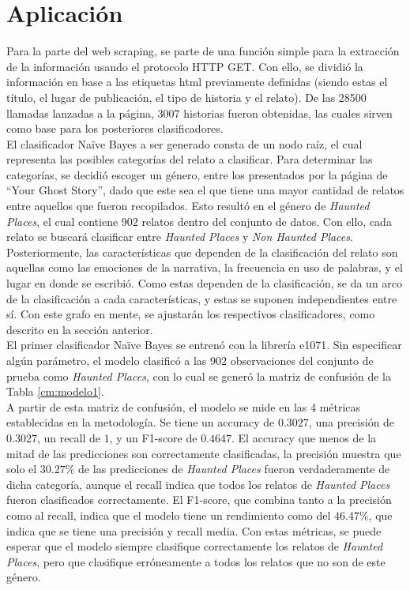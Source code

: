 \documentclass[12pt, letterpaper]{report}
\begin{document}
\section*{Aplicación}

Para la parte del web scraping, se parte de una función simple para la extracción de la información usando el protocolo HTTP GET. Con ello, se dividió la información en base a las etiquetas html previamente definidas (siendo estas el título, el lugar de publicación, el tipo de historia y el relato). De las 28500 llamadas lanzadas a la página, 3007 historias fueron obtenidas, las cuales sirven como base para los posteriores clasificadores.
\\

El clasificador Naïve Bayes a ser generado consta de un nodo raíz, el cual representa las posibles categorías del relato a clasificar. Para determinar las categorías, se decidió escoger un género, entre los presentados por la página de “Your Ghost Story”, dado que este sea el que tiene una mayor cantidad de relatos entre aquellos que fueron recopilados. Esto resultó en el género de \textit{Haunted Places}, el cual contiene $902$ relatos dentro del conjunto de datos. Con ello, cada relato se buscará clasificar entre \textit{Haunted Places} y \textit{Non Haunted Places}.
\\

Posteriormente, las características que dependen de la clasificación del relato son aquellas como las emociones de la narrativa, la frecuencia en uso de palabras, y el lugar en donde se escribió. Como estas dependen de la clasificación, se da un arco de la clasificación a cada características, y estas se suponen independientes entre sí. Con este grafo en mente, se ajustarán los respectivos clasificadores, como descrito en la sección anterior.
\\

El primer clasificador Naïve Bayes se entrenó con la librería e1071. Sin especificar algún parámetro, el modelo clasificó a las $902$ observaciones del conjunto de prueba como \textit{Haunted Places}, con lo cual se generó la matriz de confusión de la Tabla \ref{cm:modelo1}.
\\

A partir de esta matriz de confusión, el modelo se mide en las 4 métricas establecidas en la metodología. Se tiene un accuracy de $0.3027$, una precisión de $0.3027$, un recall de $1$, y un F1-score de $0.4647$. El accuracy que menos de la mitad de las predicciones son correctamente clasificadas, la precisión muestra que solo el $30.27\%$ de las predicciones de \textit{Haunted Places} fueron verdaderamente de dicha categoría, aunque el recall indica que todos los relatos de \textit{Haunted Places} fueron clasificados correctamente. El F1-score, que combina tanto a la precisión como al recall, indica que el modelo tiene un rendimiento como del $46.47\%$, que indica que se tiene una precisión y recall media. Con estas métricas, se puede esperar que el modelo siempre clasifique correctamente los relatos de \textit{Haunted Places}, pero que clasifique erróneamente a todos los relatos que no son de este género.
\end{document}
